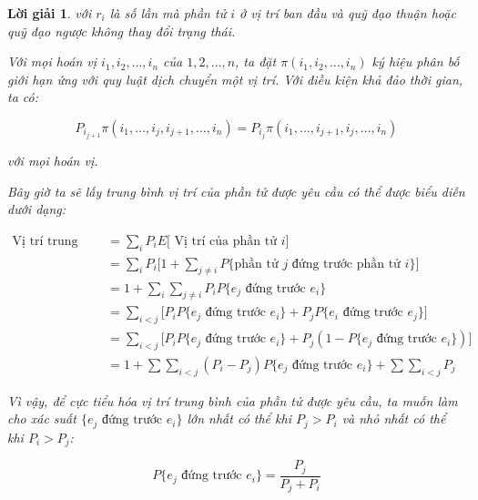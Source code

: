 \documentclass[14pt, a4paper]{article}
\numberwithin{equation}{section}
\numberwithin{figure}{section}
\theoremstyle{sltheorem}
\theoremstyle{soltheorem}
\newtheorem*{loigiai}{Lời giải}
\numberwithin{dl}{section}
\numberwithin{md}{section}
\numberwithin{vd}{section}
\begin{document}
\begin{loigiai}
        với $r_i$ là số lần mà phần tử $i$ ở vị trí ban đầu và quỹ đạo thuận hoặc quỹ đạo ngược không thay đổi trạng thái.

        Với mọi hoán vị $i_1, i_2, \dots, i_n$ của $1, 2, \dots, n$, ta đặt $\pi (i_1, i_2, \dots, i_n)$ ký hiệu phân bố giới hạn ứng với quy luật dịch chuyển một vị trí.
        Với điều kiện khả đảo thời gian, ta có:

        \begin{equation} \label{eq:4.27}
            P_{i_{j+1}} \pi (i_1, \dots, i_j, i_{j+1}, \dots, i_n) = P_{i_j} \pi (i_1, \dots, i_{j+1}, i_j, \dots, i_n)
        \end{equation}

        với mọi hoán vị.

        Bây giờ ta sẽ lấy trung bình vị trí của phần tử được yêu cầu có thể được biểu diễn dưới dạng:

        \begin{equation*}
            \begin{aligned}
                \text{Vị trí trung bình } &= \displaystyle \sum_i P_i E \lbrack \text{ Vị trí của phần tử } i \rbrack \\
                &= \displaystyle \sum_i P_i \Bigg \lbrack 1+ \sum_{j \neq i} P \lbrace \text{phần tử } j \text{ đứng trước phần tử } i \rbrace \Bigg \rbrack \\
                &= 1 + \sum_i \sum_{j \neq i} P_i P \lbrace e_j \text{ đứng trước } e_i \rbrace \\
                &= \sum_{i < j} \lbrack P_i P \lbrace e_j \text{ đứng trước } e_i \rbrace + P_j P \lbrace e_i \text{ đứng trước } e_j \rbrace  \rbrack \\
                &= \sum_{i < j} \lbrack P_i P \lbrace e_j \text{ đứng trước } e_i \rbrace + P_j (1 - P \lbrace e_j \text{ đứng trước } e_i \rbrace)  \rbrack \\
                &= 1 + \sum\sum_{i<j} (P_i - P_j) P \lbrace e_j \text{ đứng trước } e_i \rbrace + \sum\sum_{i<j} P_j
            \end{aligned}
        \end{equation*}

        Vì vậy, để cực tiểu hóa vị trí trung bình của phần tử được yêu cầu, ta muốn làm cho xác suất $\lbrace e_j \text{ đứng trước } e_i \rbrace$ lớn nhất có thể khi $P_j > P_i$ và nhỏ nhất có thể khi $P_i > P_j$:

        \begin{equation*}
            P \lbrace e_j \text{ đứng trước } e_i \rbrace = \dfrac{P_j}{P_j + P_i}
        \end{equation*}


\end{loigiai}
\end{document}
